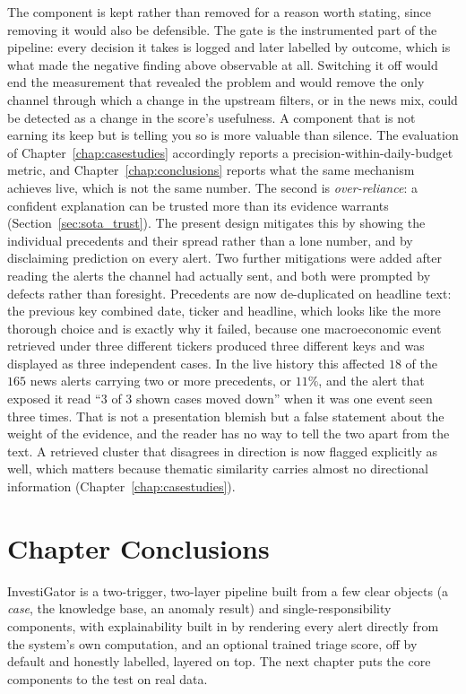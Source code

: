 The component is kept rather than removed for a reason worth stating, since removing it would also be
defensible. The gate is the instrumented part of the pipeline: every decision it takes is logged and
later labelled by outcome, which is what made the negative finding above observable at all. Switching
it off would end the measurement that revealed the problem and would remove the only channel through
which a change in the upstream filters, or in the news mix, could be detected as a change in the
score's usefulness. A component that is not earning its keep but is telling you so is more valuable
than silence. The evaluation of Chapter~\ref{chap:casestudies} accordingly reports a
precision-within-daily-budget metric, and Chapter~\ref{chap:conclusions} reports what the same
mechanism achieves live, which is not the same number. The second is
\emph{over-reliance}: a confident explanation can be trusted more than its evidence warrants
(Section~\ref{sec:sota_trust}). The present design mitigates this by showing the individual precedents
and their spread rather than a lone number, and by disclaiming prediction on every alert. Two further
mitigations were added after reading the alerts the channel had actually sent, and both were prompted
by defects rather than foresight. Precedents are now de-duplicated on headline text: the previous key
combined date, ticker and headline, which looks like the more thorough choice and is exactly why it
failed, because one macroeconomic event retrieved under three different tickers produced three
different keys and was displayed as three independent cases. In the live history this affected $18$ of
the $165$ news alerts carrying two or more precedents, or $11\%$, and the alert that exposed it read
``$3$ of $3$ shown cases moved down'' when it was one event seen three times. That is not a
presentation blemish but a false statement about the weight of the evidence, and the reader has no way
to tell the two apart from the text. A retrieved cluster that disagrees in direction is now flagged
explicitly as well, which matters because thematic similarity carries almost no directional
information (Chapter~\ref{chap:casestudies}).

\section{Chapter Conclusions}
\label{sec:investigator_summary}

InvestiGator is a two-trigger, two-layer pipeline built from a few clear objects (a \emph{case}, the knowledge
base, an anomaly result) and single-responsibility components, with explainability built in by rendering
every alert directly from the system's own computation, and an optional trained triage score, off by
default and honestly labelled, layered on top. The next chapter puts the core components to the test on
real data.
